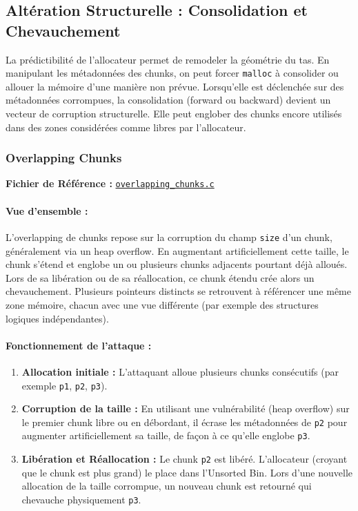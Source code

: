 \subsection{Altération Structurelle : Consolidation et Chevauchement}

La prédictibilité de l’allocateur permet de remodeler la géométrie du tas.
En manipulant les métadonnées des chunks, on peut forcer \texttt{malloc} à
consolider ou allouer la mémoire d’une manière non prévue. Lorsqu’elle est
déclenchée sur des métadonnées corrompues, la consolidation (forward ou
backward) devient un vecteur de corruption structurelle.
Elle peut englober des chunks encore utilisés dans des zones considérées comme libres par
l’allocateur.


\subsubsection{Overlapping Chunks}

\noindent\textbf{Fichier de Référence :} \href{https://github.com/shellphish/how2heap/blob/master/glibc_2.41/overlapping_chunks.c}{\texttt{overlapping\_chunks.c}}

\paragraph{Vue d'ensemble :}
L’overlapping de chunks repose sur la corruption du champ \texttt{size} d’un chunk,
généralement via un heap overflow. En augmentant artificiellement cette taille,
le chunk s’étend et englobe un ou plusieurs chunks adjacents pourtant déjà alloués.
Lors de sa libération ou de sa réallocation, ce chunk étendu crée alors un
chevauchement.
Plusieurs pointeurs distincts se retrouvent à référencer une
même zone mémoire, chacun avec une vue différente (par exemple des structures
logiques indépendantes).

\paragraph{Fonctionnement de l'attaque :}
\begin{enumerate}
    \item \textbf{Allocation initiale :} L'attaquant alloue plusieurs chunks consécutifs (par exemple \texttt{p1}, \texttt{p2}, \texttt{p3}).
    \item \textbf{Corruption de la taille :} En utilisant une vulnérabilité (heap overflow) sur le premier chunk libre ou en débordant, il écrase les métadonnées de \texttt{p2} pour augmenter artificiellement sa taille, de façon à ce qu'elle englobe \texttt{p3}.
    \item \textbf{Libération et Réallocation :} Le chunk \texttt{p2} est libéré. L'allocateur (croyant que le chunk est plus grand) le place dans l'Unsorted Bin. Lors d'une nouvelle allocation de la taille corrompue, un nouveau chunk est retourné qui chevauche physiquement \texttt{p3}.
\end{enumerate}

